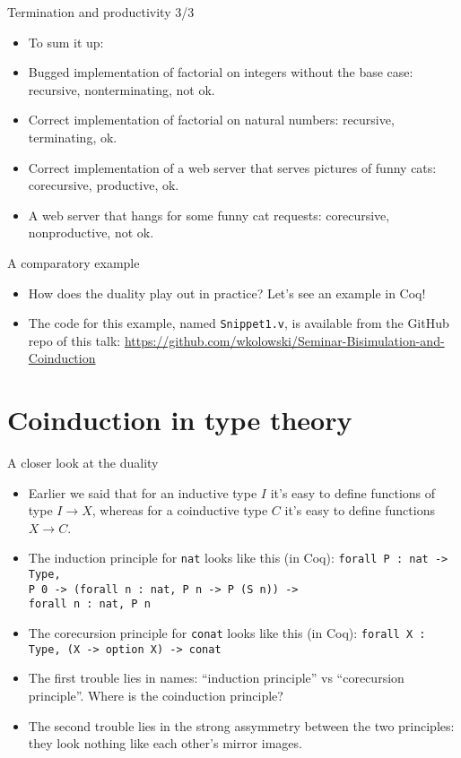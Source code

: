 \documentclass{beamer}
\begin{document}
\begin{frame}{Termination and productivity 3/3}
\begin{itemize}
	\item To sum it up:
	\item Bugged implementation of factorial on integers without the base case: recursive, nonterminating, not ok.
	\item Correct implementation of factorial on natural numbers: recursive, terminating, ok.
	\item Correct implementation of a web server that serves pictures of funny cats: corecursive, productive, ok.
	\item A web server that hangs for some funny cat requests: corecursive, nonproductive, not ok.
\end{itemize}
\end{frame}

\begin{frame}{A comparatory example}
\begin{itemize}
	\item How does the duality play out in practice? Let's see an example in Coq!
	\item The code for this example, named \texttt{Snippet1.v}, is available from the GitHub repo of this talk: \url{https://github.com/wkolowski/Seminar-Bisimulation-and-Coinduction}
\end{itemize}
\end{frame}

\section{Coinduction in type theory}

\begin{frame}{A closer look at the duality}
\begin{itemize}
	\item Earlier we said that for an inductive type $I$ it's easy to define functions of type $I \to X$, whereas for a coinductive type $C$ it's easy to define functions $X \to C$.
	\item The induction principle for \texttt{nat} looks like this (in Coq): \texttt{forall P : nat -> Type, \\ P 0 -> (forall n : nat, P n -> P (S n)) -> \\ forall n : nat, P n}
	\item The corecursion principle for \texttt{conat} looks like this (in Coq): \texttt{forall X : Type, (X -> option X) -> conat}
	\item The first trouble lies in names: ``induction principle'' vs ``corecursion principle''. Where is the coinduction principle?
	\item The second trouble lies in the strong assymmetry between the two principles: they look nothing like each other's mirror images.
\end{itemize}
\end{frame}
\end{document}
